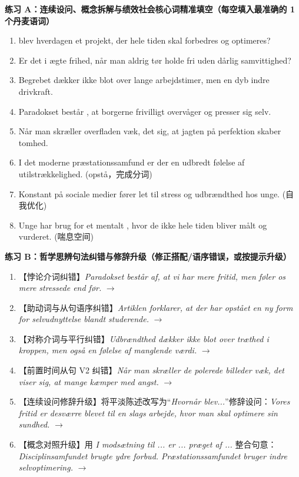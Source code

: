 \textbf{练习 A：连续设问、概念拆解与绩效社会核心词精准填空（每空填入最准确的 1 个丹麦语词）}
\begin{enumerate}
  \item \underline{\hspace{2.2cm}} blev hverdagen et projekt, der hele tiden skal forbedres og optimeres?
  \item Er det i \underline{\hspace{2.2cm}} ægte frihed, når man aldrig tør holde fri uden dårlig samvittighed?
  \item Begrebet dækker ikke blot over lange arbejdstimer, men \underline{\hspace{2.2cm}} en dyb indre drivkraft.
  \item Paradokset består \underline{\hspace{2.2cm}}, at borgerne frivilligt overvåger og presser sig selv.
  \item Når man skræller overfladen væk, \underline{\hspace{2.2cm}} det sig, at jagten på perfektion skaber tomhed.
  \item I det moderne præstationssamfund er der \underline{\hspace{2.2cm}} en udbredt følelse af utilstrækkelighed. (opstå，完成分词)
  \item Konstant \underline{\hspace{2.2cm}} på sociale medier fører let til stress og udbrændthed hos unge. (自我优化)
  \item Unge har brug for et mentalt \underline{\hspace{2.2cm}}, hvor de ikke hele tiden bliver målt og vurderet. (喘息空间)
\end{enumerate}

\textbf{练习 B：哲学思辨句法纠错与修辞升级（修正搭配/语序错误，或按提示升级）}
\begin{enumerate}
  \item 【悖论介词纠错】\textit{Paradokset består af, at vi har mere fritid, men føler os mere stressede end før.} $\rightarrow$
  \item 【助动词与从句语序纠错】\textit{Artiklen forklarer, at der har opstået en ny form for selvudnyttelse blandt studerende.} $\rightarrow$
  \item 【对称介词与平行纠错】\textit{Udbrændthed dækker ikke blot over træthed i kroppen, men også en følelse af manglende værdi.} $\rightarrow$
  \item 【前置时间从句 V2 纠错】\textit{Når man skræller de polerede billeder væk, det viser sig, at mange kæmper med angst.} $\rightarrow$
  \item 【连续设问修辞升级】将平淡陈述改写为“\textit{Hvornår blev...}”修辞设问：\textit{Vores fritid er desværre blevet til en slags arbejde, hvor man skal optimere sin sundhed.} $\rightarrow$
  \item 【概念对照升级】用 \textit{I modsætning til ... er ... præget af ...} 整合句意：\textit{Disciplinsamfundet brugte ydre forbud. Præstationssamfundet bruger indre selvoptimering.} $\rightarrow$
\end{enumerate}

